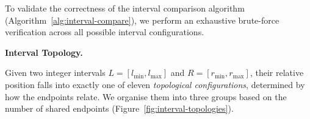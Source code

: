 \documentclass[pdflatex,sn-basic]{sn-jnl}%
\theoremstyle{thmstyleone}%
\theoremstyle{thmstyletwo}%
\theoremstyle{thmstylethree}%
\begin{document}
To validate the correctness of the interval comparison algorithm
(Algorithm~\ref{alg:interval-compare}), we perform an exhaustive
brute-force verification across all possible interval configurations.

\smallskip\noindent\textbf{Interval Topology.}

Given two integer intervals $L = [l_{\min}, l_{\max}]$ and
$R = [r_{\min}, r_{\max}]$, their relative position falls into exactly
one of eleven \emph{topological configurations}, determined by how the
endpoints relate.  We organise them into three groups based on the
number of shared endpoints (Figure~\ref{fig:interval-topologies}).

\begin{figure}[t]
\centering
\newcommand{\ivcase}[7]{%
  \draw[ax] ({#1},{#2}) -- ({#1+11.8},{#2});%
  \fill[Lb] ({#1+#3},{#2}) rectangle ({#1+#4},{#2-\rh});%
  \fill[Rb] ({#1+#5},{#2}) rectangle ({#1+#6},{#2-\rh});%
  \node[el] at ({#1+#3},{#2-\rh-\lp}) {$l_{\min}$};%
  \node[el] at ({#1+#4},{#2-\rh-\lp}) {$l_{\max}$};%
  \node[er] at ({#1+#5},{#2+\lp}) {$r_{\min}$};%
  \node[er] at ({#1+#6},{#2+\lp}) {$r_{\max}$};%
  \node[lbl] at ({#1-0.5},{#2-\lmid}) {#7};%
}
\newcommand{\shrmark}[2]{%
  \draw[shr] ({#1},{#2-\rh-0.08}) -- ({#1},{#2+0.12});%
}
\end{figure}
\end{document}
